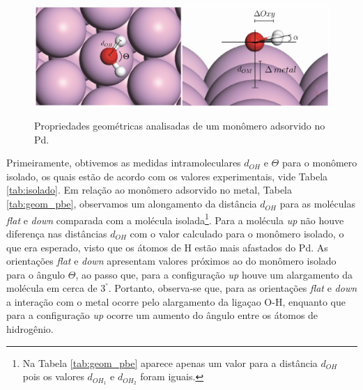 \begin{figure}[t!]
	\centering
	\caption{Propriedades geométricas analisadas de um monômero adsorvido no Pd.}
	\includegraphics[scale=0.45]{figs/properties.png}
	\label{fig:properties}
\end{figure}

Primeiramente, obtivemos as medidas intramoleculares $ d_{OH} $ e $ \Theta $ para o monômero isolado, os quais estão de acordo com os valores experimentais, vide Tabela \ref{tab:isolado}. Em relação ao monômero adsorvido no metal, Tabela \ref{tab:geom_pbe}, observamos um alongamento da distância $ d_{OH} $ para as moléculas \textit{flat} e \textit{down} comparada com a molécula isolada\footnote{Na Tabela \ref{tab:geom_pbe} aparece apenas um valor para a distância $ d_{OH} $ pois os valores $ d_{OH_1} $ e $ d_{OH_2} $ foram iguais.}. Para a molécula \textit{up} não houve diferença nas distâncias $ d_{OH} $ com o valor calculado para o monômero isolado, o que era esperado, visto que os átomos de H estão mais afastados do Pd. As orientações \textit{flat} e \textit{down} apresentam valores próximos ao do monômero isolado para o ângulo $ \Theta $, ao passo que, para a configuração \textit{up} houve um alargamento da molécula em cerca de 3$ ^{\si{\degree}} $. Portanto, observa-se que, para as orientações \textit{flat} e \textit{down} a interação com o metal ocorre pelo alargamento da ligaçao O-H, enquanto que para a configuração \textit{up} ocorre um aumento do ângulo entre os átomos de hidrogênio.



